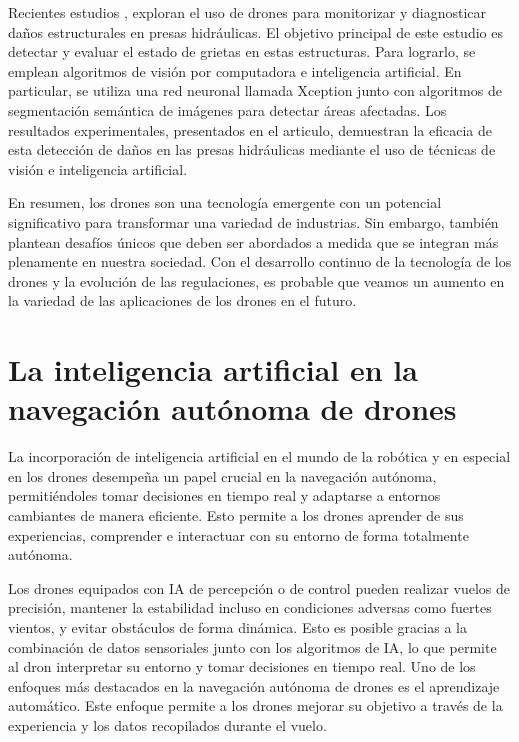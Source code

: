 Recientes estudios \cite{rs15030615}, exploran el uso de drones
para monitorizar y diagnosticar daños estructurales en presas hidráulicas. El objetivo principal de este estudio es detectar y evaluar el estado de  grietas en estas estructuras. Para lograrlo, 
se emplean algoritmos de visión por computadora e inteligencia artificial. 
En particular, se utiliza una red neuronal llamada Xception \cite{Deeplabv3} junto con algoritmos de segmentación semántica de imágenes para detectar áreas afectadas. Los resultados experimentales, 
presentados en el articulo, demuestran la eficacia de esta detección de daños en las presas hidráulicas mediante el uso de técnicas de visión e inteligencia artificial. 

En resumen, los drones son una tecnología emergente con un potencial significativo
para transformar una variedad de industrias. Sin embargo, también plantean desafíos únicos que deben ser abordados a medida que se integran más plenamente en nuestra
sociedad. Con el desarrollo continuo de la tecnología de los drones y la evolución de las
regulaciones, es probable que veamos un aumento en la variedad de las aplicaciones de
los drones en el futuro. 


\section{La inteligencia artificial en la navegación autónoma de drones}
\label{sec:IA}

La incorporación de inteligencia artificial en el mundo de la robótica y en especial en los drones desempeña un papel crucial en la navegación autónoma, permitiéndoles tomar decisiones en 
tiempo real y adaptarse 
a entornos cambiantes de manera eficiente. Esto permite a los drones aprender de sus experiencias, comprender e interactuar con su entorno de forma totalmente autónoma.

Los drones equipados con IA de percepción o de control pueden realizar vuelos de precisión, mantener la estabilidad incluso en condiciones adversas como fuertes vientos, y evitar obstáculos 
de forma dinámica. Esto es posible gracias a la combinación de datos sensoriales junto con los algoritmos de IA, lo que permite 
al dron interpretar su entorno y tomar decisiones en tiempo real. Uno de los enfoques más destacados en la navegación autónoma de drones es el aprendizaje automático. Este enfoque permite a los drones mejorar su objetivo a través de la experiencia 
y los datos recopilados durante el vuelo. 

